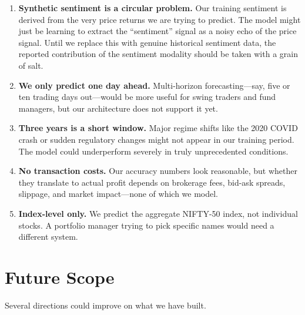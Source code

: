 \documentclass[conference]{IEEEtran}
\begin{document}
\begin{enumerate}
\item \textbf{Synthetic sentiment is a circular problem.} Our training sentiment is derived from the very price returns we are trying to predict. The model might just be learning to extract the ``sentiment'' signal as a noisy echo of the price signal. Until we replace this with genuine historical sentiment data, the reported contribution of the sentiment modality should be taken with a grain of salt.
\item \textbf{We only predict one day ahead.} Multi-horizon forecasting---say, five or ten trading days out---would be more useful for swing traders and fund managers, but our architecture does not support it yet.
\item \textbf{Three years is a short window.} Major regime shifts like the 2020 COVID crash or sudden regulatory changes might not appear in our training period. The model could underperform severely in truly unprecedented conditions.
\item \textbf{No transaction costs.} Our accuracy numbers look reasonable, but whether they translate to actual profit depends on brokerage fees, bid-ask spreads, slippage, and market impact---none of which we model.
\item \textbf{Index-level only.} We predict the aggregate NIFTY-50 index, not individual stocks. A portfolio manager trying to pick specific names would need a different system.
\end{enumerate}

\section{Future Scope}
Several directions could improve on what we have built.
\end{document}
